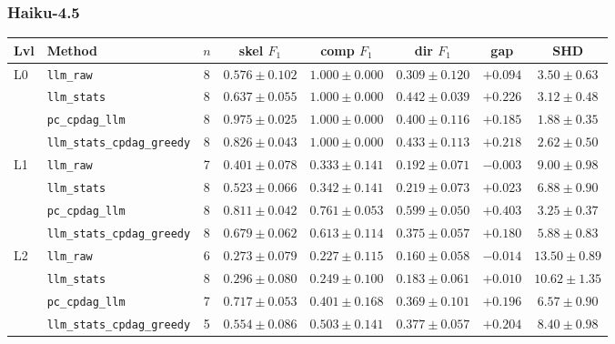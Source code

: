 \subsubsection{Haiku-4.5}
\label{app:results:haiku45}

\begin{center}
\scriptsize
\setlength{\tabcolsep}{3.0pt}
\begin{tabular}{@{}l l c c c c c c@{}}
\toprule
Lvl & Method & $n$ & skel $F_1$ & comp $F_1$ & dir $F_1$ & gap & SHD \\
\midrule
L0 & \texttt{llm\_raw}                & 8 & $0.576 \pm 0.102$ & $1.000 \pm 0.000$ & $0.309 \pm 0.120$ & $+0.094$ & $3.50 \pm 0.63$ \\
   & \texttt{llm\_stats}              & 8 & $0.637 \pm 0.055$ & $1.000 \pm 0.000$ & $0.442 \pm 0.039$ & $+0.226$ & $3.12 \pm 0.48$ \\
   & \texttt{pc\_cpdag\_llm}          & 8 & $0.975 \pm 0.025$ & $1.000 \pm 0.000$ & $0.400 \pm 0.116$ & $+0.185$ & $1.88 \pm 0.35$ \\
   & \texttt{llm\_stats\_cpdag\_greedy} & 8 & $0.826 \pm 0.043$ & $1.000 \pm 0.000$ & $0.433 \pm 0.113$ & $+0.218$ & $2.62 \pm 0.50$ \\
\midrule
L1 & \texttt{llm\_raw}                & 7 & $0.401 \pm 0.078$ & $0.333 \pm 0.141$ & $0.192 \pm 0.071$ & $-0.003$ & $9.00 \pm 0.98$ \\
   & \texttt{llm\_stats}              & 8 & $0.523 \pm 0.066$ & $0.342 \pm 0.141$ & $0.219 \pm 0.073$ & $+0.023$ & $6.88 \pm 0.90$ \\
   & \texttt{pc\_cpdag\_llm}          & 8 & $0.811 \pm 0.042$ & $0.761 \pm 0.053$ & $0.599 \pm 0.050$ & $+0.403$ & $3.25 \pm 0.37$ \\
   & \texttt{llm\_stats\_cpdag\_greedy} & 8 & $0.679 \pm 0.062$ & $0.613 \pm 0.114$ & $0.375 \pm 0.057$ & $+0.180$ & $5.88 \pm 0.83$ \\
\midrule
L2 & \texttt{llm\_raw}                & 6 & $0.273 \pm 0.079$ & $0.227 \pm 0.115$ & $0.160 \pm 0.058$ & $-0.014$ & $13.50 \pm 0.89$ \\
   & \texttt{llm\_stats}              & 8 & $0.296 \pm 0.080$ & $0.249 \pm 0.100$ & $0.183 \pm 0.061$ & $+0.010$ & $10.62 \pm 1.35$ \\
   & \texttt{pc\_cpdag\_llm}          & 7 & $0.717 \pm 0.053$ & $0.401 \pm 0.168$ & $0.369 \pm 0.101$ & $+0.196$ & $6.57 \pm 0.90$ \\
   & \texttt{llm\_stats\_cpdag\_greedy} & 5 & $0.554 \pm 0.086$ & $0.503 \pm 0.141$ & $0.377 \pm 0.057$ & $+0.204$ & $8.40 \pm 0.98$ \\

\end{tabular}
\end{center}
